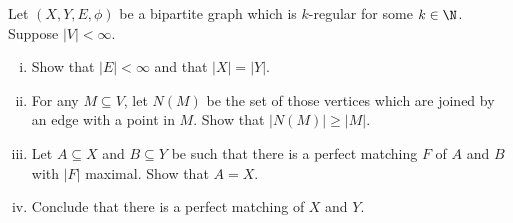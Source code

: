 \documentclass[10pt]{mypackage}
\begin{document}
  \begin{exercise}
  Let $(X,Y,E,\phi)$ be a bipartite graph which is $k$-regular for some $k\in\N$. Suppose $|V| < \infty$.
  \begin{enumerate}[(i)]
    \item Show that $|E| < \infty$ and that $|X| = |Y|$.
    \item For any $M\subseteq V$, let $N(M)$ be the set of those vertices which are joined by an edge with a point in $M$. Show that $|N(M)| \geq |M|$.
    \item Let $A\subseteq X$ and $B\subseteq Y$ be such that there is a perfect matching $F$ of $A$ and $B$ with $|F|$ maximal. Show that $A = X$.
    \item Conclude that there is a perfect matching of $X$ and $Y$.
  \end{enumerate}
  \end{exercise}
\end{document}
